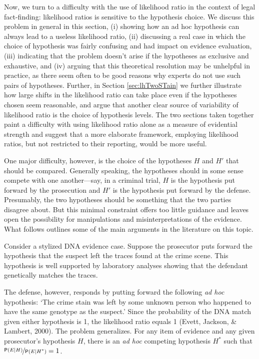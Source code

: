 \documentclass[
  10pt,
  dvipsnames,enabledeprecatedfontcommands]{scrartcl}
\newcommand{\pr}[1]{\mathsf{P}(#1)}
\begin{document}
Now, we turn to a difficulty with the use of likelihood ratio in the
context of legal fact-finding: likelihood ratios is sensitive to the
hypothesis choice. We discuss this problem in general in this section,
(i) showing how an ad hoc hypothesis can always lead to a useless
likelihood ratio, (ii) discussing a real case in which the choice of
hypothesis was fairly confusing and had impact on evidence evaluation,
(iii) indicating that the problem doesn't arise if the hypotheses as
exclusive and exhaustive, and (iv) arguing that this theoretical
resolution may be unhelpful in practice, as there seem often to be good
reasons why experts do not use such pairs of hypotheses. Further, in
Section \ref{sec:lhTwoSTain} we further illustrate how large shifts in
the likelihood ratio can take place even if the hypotheses chosen seem
reasonable, and argue that another clear source of variability of
likelihood ratio is the choice of hypothesis levels. The two sections
taken together paint a difficulty with using likelihood ratio alone as a
measure of evidential strength and suggest that a more elaborate
framework, employing likelihood ratios, but not restricted to their
reporting, would be more useful.

One major difficulty, however, is the choice of the hypotheses \(H\) and
\(H'\) that should be compared. Generally speaking, the hypotheses
should in some sense compete with one another---say, in a criminal
trial, \(H\) is the hypothesis put forward by the prosecution and \(H'\)
is the hypothesis put forward by the defense. Presumably, the two
hypotheses should be something that the two parties disagree about. But
this minimal constraint offers too little guidance and leaves open the
possibility for manipulations and misinterpretations of the evidence.
What follows outlines some of the main arguments in the literature on
this topic.

Consider a stylized DNA evidence case. Suppose the prosecutor puts
forward the hypothesis that the suspect left the traces found at the
crime scene. This hypothesis is well supported by laboratory analyses
showing that the defendant genetically matches the traces.

The defense, however, responds by putting forward the following
\textit{ad hoc} hypothesis: `The crime stain was left by some unknown
person who happened to have the same genotype as the suspect.' Since the
probability of the DNA match given either hypothesis is 1, the
likelihood ratio equals 1 (Evett, Jackson, \& Lambert, 2000). The
problem generalizes. For any item of evidence and any given prosecutor's
hypothesis \(H\), there is an \textit{ad hoc} competing hypothesis
\(H^*\) such that \(\nicefrac{\pr{E \vert H}}{\pr{E \vert H^*}}=1\).
\end{document}
